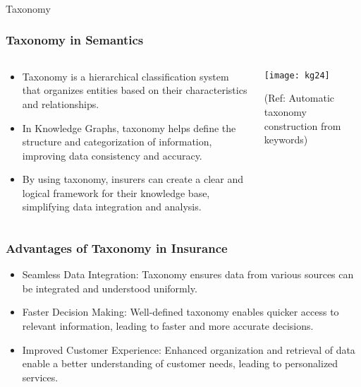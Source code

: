 \begin{frame}[fragile]\frametitle{}
\begin{center}
{\Large Taxonomy}
\end{center}
\end{frame}


\begin{frame}[fragile]
\frametitle{Taxonomy in Semantics}

\begin{columns}
    \begin{column}[T]{0.6\linewidth}
		\begin{itemize}
		\item Taxonomy is a hierarchical classification system that organizes entities based on their characteristics and relationships.
		\item In Knowledge Graphs, taxonomy helps define the structure and categorization of information, improving data consistency and accuracy.
		\item By using taxonomy, insurers can create a clear and logical framework for their knowledge base, simplifying data integration and analysis.
		\end{itemize}

    \end{column}
    \begin{column}[T]{0.4\linewidth}  
		\begin{center}
		\texttt{[image: kg24]}

		{\tiny (Ref: Automatic taxonomy construction from keywords)}
		\end{center}    
    \end{column}
  \end{columns}

\end{frame}

\begin{frame}[fragile]
\frametitle{Advantages of Taxonomy in Insurance}
\begin{itemize}
\item Seamless Data Integration: Taxonomy ensures data from various sources can be integrated and understood uniformly.
\item Faster Decision Making: Well-defined taxonomy enables quicker access to relevant information, leading to faster and more accurate decisions.
\item Improved Customer Experience: Enhanced organization and retrieval of data enable a better understanding of customer needs, leading to personalized services.
\end{itemize}
\end{frame}

